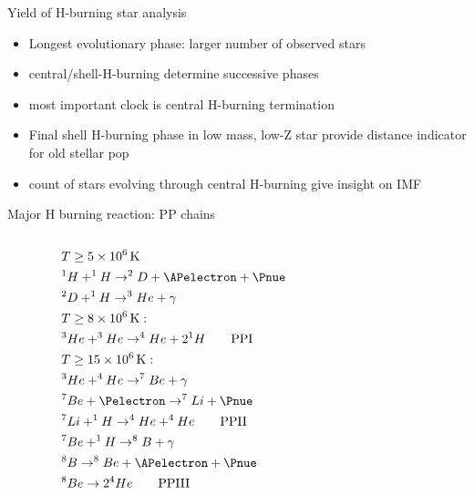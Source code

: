 \begin{frame}{Yield of H-burning star analysis}
\begin{itemize}
\item Longest evolutionary phase: larger number of observed stars
\item central/shell-H-burning determine successive phases
\item most important clock is central H-burning termination
\item Final shell H-burning phase in low mass, low-Z star provide distance indicator for old stellar pop
\item count of stars evolving through central H-burning give insight on IMF
\end{itemize}
\end{frame}

\begin{frame}[fragile]{Major H burning reaction: PP chains}
\begin{columns}[T]\begin{column}{0.45\textwidth}
\begin{align*} 
&T\geq\SI{5e6}{\kelvin}\\
&^1H+^1H\to^2D+\APelectron+\Pnue\\
&^2D+^1H\to^3He+\gamma\\
&T\geq\SI{8e6}{\kelvin}:\\
&^3He+^3He\to^4He+2^1H\tag*{PPI}\\
&T\geq\SI{15e6}{\kelvin}:\\
&^3He+^4He\to^7Be+\gamma\\
&^7Be+\Pelectron\to^7Li+\Pnue\\
&^7Li+^1H\to^4He+^4He\tag*{PPII}\\
&^7Be+^1H\to^8B+\gamma\\
&^8B\to^8Be+\APelectron+\Pnue\\
&^8Be\to2^4He\tag*{PPIII}
\end{align*}
\end{column}\begin{column}{0.55\textwidth}
\begin{comment} 
\begin{align*}
&r_{pp}=\num{11.5e10}\rho^2X_H^2T_6\expy{-2/3}\\
&\exp{-33.81T_6\expy{-1/3}}(1+\num{0.0123}T_6\expy{1/3}+\num{0.0109}T_6\expy{2/3}\\
&+\num{0.00095}T_6)\\
&\rho\epsilon(3H\to^3He)=\\
&(\SI{6.936}{\mega\ev}-\SI{0.263}{\mega\ev})*\SI{1.602e-6}{\erg}*r_{pp}\\

\end{comment}
\end{column}
\end{columns}
\end{frame}
